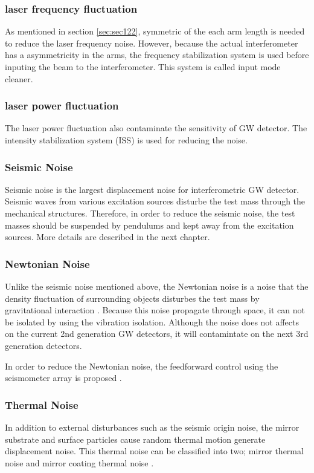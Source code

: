 \subsubsection{laser frequency fluctuation}
As mentioned in section \ref{sec:sec122}, symmetric of the each arm length is needed to reduce the laser frequency noise. However, because the actual interferometer has a asymmetricity in the arms, the frequency stabilization system is used before inputing the beam to the interferometer. This system is called input mode cleaner.

\subsubsection{laser power fluctuation}
The laser power fluctuation also contaminate the sensitivity of GW detector. The intensity stabilization system (ISS) is used for reducing the noise.

\subsubsection{Seismic Noise}
Seismic noise is the largest displacement noise for interferometric GW detector. Seismic waves from various excitation sources disturbe the test mass through the mechanical structures. Therefore, in order to reduce the seismic noise, the test masses should be suspended by pendulums and kept away from the excitation sources. More details are described in the next chapter.

\subsubsection{Newtonian Noise}
Unlike the seismic noise mentioned above, the Newtonian noise is a noise that the density fluctuation of surrounding objects disturbes the test mass by gravitational interaction \cite{harms2015terrestrial}. Because this noise propagate through space, it can not be isolated by using the vibration isolation. Although the noise does not affects on the current 2nd generation GW detectors, it will contamintate on the next 3rd generation detectors.

In order to reduce the Newtonian noise, the feedforward control using the seismometer array is proposed \cite{driggers2015noise}.

\subsubsection{Thermal Noise}
In addition to external disturbances such as the seismic origin noise, the mirror substrate and surface particles cause random thermal motion generate displacement noise. This thermal noise can be classified into two; mirror thermal noise and mirror coating thermal noise \cite{dan2016study}.

